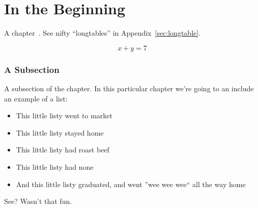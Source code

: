







\chapter{In the Beginning}
A chapter~\cite{ref:A,ref:B,ref:C}. See nifty ``longtables'' in Appendix~\ref{sec:longtable}.


\begin{equation}
x+y=7
\end{equation}


\subsection{A Subsection}%
A subsection of the chapter.  In this particular chapter we're going to an include an example of a list:
\begin{itemize}
	\item This little listy went to market
	\item This little listy stayed home
	\item This little listy had roast beef
	\item This little listy had none
	\item And this little listy graduated, and went ''wee wee wee`` all the way home
\end{itemize}
See? Wasn't that fun.

